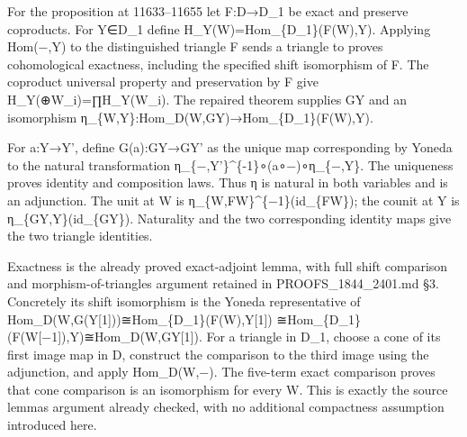 \documentclass[11pt]{article}
\begin{document}
For the proposition at 11633–\allowbreak{}11655 let F:\allowbreak{}D\allowbreak{}→D\_\allowbreak{}1 be exact and preserve coproducts. For Y\allowbreak{}∈D\_\allowbreak{}1 define H\_\allowbreak{}Y(W)\allowbreak{}\allowbreak{}=Hom\_\allowbreak{}\{D\_\allowbreak{}1\}(F(W)\allowbreak{},\allowbreak{}Y)\allowbreak{}. Applying Hom(−,\allowbreak{}Y)\allowbreak{} to the distinguished triangle F sends a triangle to proves cohomological exactness,\allowbreak{} including the specified shift isomorphism of F. The coproduct universal property and preservation by F give H\_\allowbreak{}Y(\allowbreak{}⊕W\_\allowbreak{}i)\allowbreak{}\allowbreak{}=∏H\_\allowbreak{}Y(W\_\allowbreak{}i)\allowbreak{}. The repaired theorem supplies GY and an isomorphism η\_\allowbreak{}\{W,\allowbreak{}Y\}:\allowbreak{}Hom\_\allowbreak{}D(W,\allowbreak{}GY)\allowbreak{}\allowbreak{}→Hom\_\allowbreak{}\{D\_\allowbreak{}1\}(F(W)\allowbreak{},\allowbreak{}Y)\allowbreak{}.

For a:\allowbreak{}Y\allowbreak{}→Y',\allowbreak{} define G(a)\allowbreak{}:\allowbreak{}GY\allowbreak{}→GY' as the unique map corresponding by Yoneda to the natural transformation η\_\allowbreak{}\{−,\allowbreak{}Y'\}\textasciicircum{}\{-1\}∘(a∘−)\allowbreak{}∘η\_\allowbreak{}\{−,\allowbreak{}Y\}. The uniqueness proves identity and composition laws. Thus η is natural in both variables and is an adjunction. The unit at W is η\_\allowbreak{}\{W,\allowbreak{}FW\}\textasciicircum{}\{−1\}(id\_\allowbreak{}\{FW\})\allowbreak{}; the counit at Y is η\_\allowbreak{}\{GY,\allowbreak{}Y\}(id\_\allowbreak{}\{GY\})\allowbreak{}. Naturality and the two corresponding identity maps give the two triangle identities.

Exactness is the already proved exact-adjoint lemma,\allowbreak{} with full shift comparison and morphism-of-triangles argument retained in PROOFS\_\allowbreak{}1844\_\allowbreak{}2401.md §3. Concretely its shift isomorphism is the Yoneda representative of Hom\_\allowbreak{}D(W,\allowbreak{}G(Y[1]\allowbreak{})\allowbreak{})\allowbreak{}≅Hom\_\allowbreak{}\{D\_\allowbreak{}1\}(F(W)\allowbreak{},\allowbreak{}Y[1]\allowbreak{})\allowbreak{} ≅Hom\_\allowbreak{}\{D\_\allowbreak{}1\}(F(W[−1]\allowbreak{})\allowbreak{},\allowbreak{}Y)\allowbreak{}≅Hom\_\allowbreak{}D(W,\allowbreak{}GY[1]\allowbreak{})\allowbreak{}. For a triangle in D\_\allowbreak{}1,\allowbreak{} choose a cone of its first image map in D,\allowbreak{} construct the comparison to the third image using the adjunction,\allowbreak{} and apply Hom\_\allowbreak{}D(W,\allowbreak{}−)\allowbreak{}. The five-term exact comparison proves that cone comparison is an isomorphism for every W. This is exactly the source lemma\textquotesingle s argument already checked,\allowbreak{} with no additional compactness assumption introduced here.
\end{document}

